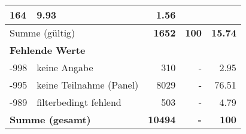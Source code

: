 \begin{longtable}{lXrrr}
       \num{164} &
       \num[round-mode=places,round-precision=2]{9.93} &
         \num[round-mode=places,round-precision=2]{1.56} \\
     \midrule
     \multicolumn{2}{l}{Summe (gültig)} &
       \textbf{\num{1652}} &
     \textbf{\num{100}} &
       \textbf{\num[round-mode=places,round-precision=2]{15.74}} \\
     \multicolumn{5}{l}{\textbf{Fehlende Werte}}\\
       -998 &
       keine Angabe &
         \num{310} &
        - &
         \num[round-mode=places,round-precision=2]{2.95} \\
       -995 &
       keine Teilnahme (Panel) &
         \num{8029} &
        - &
         \num[round-mode=places,round-precision=2]{76.51} \\
       -989 &
       filterbedingt fehlend &
         \num{503} &
        - &
         \num[round-mode=places,round-precision=2]{4.79} \\
     \midrule
     \multicolumn{2}{l}{\textbf{Summe (gesamt)}} &
          \textbf{\num{10494}} &
        \textbf{-} &
        \textbf{\num{100}} \\
     \bottomrule
     \end{longtable}
     
